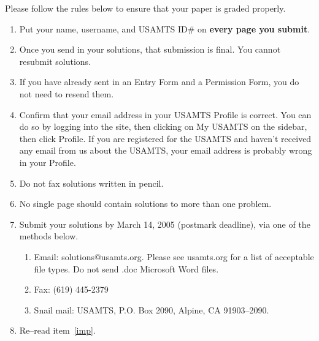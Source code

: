 \documentclass[12pt]{article}
\begin{document}
Please follow the rules below to ensure that your paper is graded properly.  

\begin{enumerate}

\item \label{imp}Put your name, username, and USAMTS ID$\#$ on {\bf every page you submit}.

\item Once you send in your solutions, that submission is final.  You cannot resubmit solutions.

\item If you have already sent in an Entry Form and a Permission Form, you do not need to resend them.

\item Confirm that your email address in your USAMTS Profile is 
correct.  You can do so by logging into the site, then clicking
on My USAMTS on the sidebar, then click Profile.  If you are registered for the USAMTS and haven't received 
any email from us about the USAMTS, your email address is probably wrong in your Profile.

\item Do not fax solutions written in pencil.

\item No single page should contain solutions to more than one problem.

\item Submit your solutions by March 14, 2005 (postmark deadline), via one of the methods below.
\begin{enumerate}
\item Email: solutions@usamts.org.  Please see usamts.org for a list of acceptable file types.
Do not send .doc Microsoft Word files.
\item Fax: (619) 445-2379
\item Snail mail: USAMTS, P.O. Box 2090, Alpine, CA 91903--2090.
\end{enumerate}

\item Re--read item~\ref{imp}.

\end{enumerate}

\pagebreak


\vskip0.25in
\end{document}
